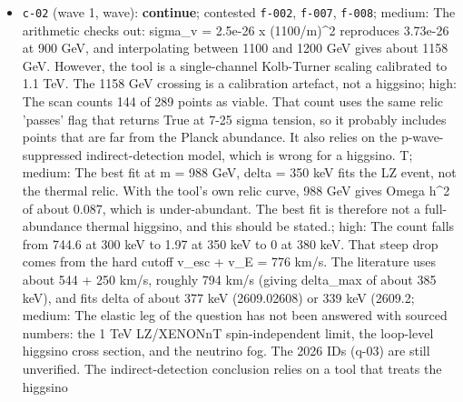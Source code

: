 \documentclass[11pt,a4paper]{article}
\begin{document}
\begin{itemize}
  \item \texttt{c-02} (wave 1, wave): \textbf{continue}; contested \texttt{f-002}, \texttt{f-007}, \texttt{f-008}; medium: The arithmetic checks out: sigma\_v = 2.5e-26 x (1100/m)\textasciicircum{}2 reproduces 3.73e-26 at 900 GeV, and interpolating between 1100 and 1200 GeV gives about 1158 GeV. However, the tool is a single-channel Kolb-Turner scaling calibrated to 1.1 TeV. The 1158 GeV crossing is a calibration artefact, not a higgsino; high: The scan counts 144 of 289 points as viable. That count uses the same relic 'passes' flag that returns True at 7-25 sigma tension, so it probably includes points that are far from the Planck abundance. It also relies on the p-wave-suppressed indirect-detection model, which is wrong for a higgsino. T; medium: The best fit at m = 988 GeV, delta = 350 keV fits the LZ event, not the thermal relic. With the tool's own relic curve, 988 GeV gives Omega h\textasciicircum{}2 of about 0.087, which is under-abundant. The best fit is therefore not a full-abundance thermal higgsino, and this should be stated.; high: The count falls from 744.6 at 300 keV to 1.97 at 350 keV to 0 at 380 keV. That steep drop comes from the hard cutoff v\_esc + v\_E = 776 km/s. The literature uses about 544 + 250 km/s, roughly 794 km/s (giving delta\_max of about 385 keV), and fits delta of about 377 keV (2609.02608) or 339 keV (2609.2; medium: The elastic leg of the question has not been answered with sourced numbers: the 1 TeV LZ/XENONnT spin-independent limit, the loop-level higgsino cross section, and the neutrino fog. The 2026 IDs (q-03) are still unverified. The indirect-detection conclusion relies on a tool that treats the higgsino 

\end{itemize}
\end{document}
